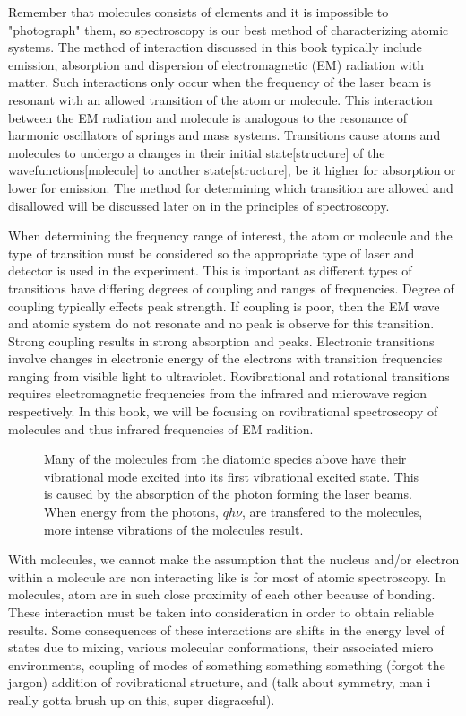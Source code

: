 \documentclass[11pt,a4paper]{book}
\newcommand{\imginput}[1]{} %
\begin{document}
		Remember that molecules consists of elements and it is impossible to "photograph" them, so spectroscopy is our best method of characterizing atomic systems. The method of interaction discussed in this book typically include emission, absorption and dispersion of electromagnetic (EM) radiation with matter. Such interactions only occur when the frequency of the laser beam is resonant with an allowed transition of the atom or molecule. This interaction between the EM radiation and molecule is analogous to the resonance of harmonic oscillators of springs and mass systems. Transitions cause atoms and molecules to undergo a changes in their initial state[structure] of the wavefunctions[molecule] to another state[structure], be it higher for absorption or lower for emission. The method for determining which transition are allowed and disallowed will be discussed later on in the principles of spectroscopy.
		
		When determining the frequency range of interest, the atom or molecule and the type of transition must be considered so the appropriate type of laser and detector is used in the experiment. This is important as different types of transitions have differing degrees of coupling and ranges of frequencies. Degree of coupling typically effects peak strength. If coupling is poor, then the EM wave and atomic system do not resonate and no peak is observe for this transition. Strong coupling results in strong absorption and peaks. Electronic transitions involve changes in electronic energy of the electrons with transition frequencies ranging from visible light to ultraviolet. Rovibrational and rotational transitions requires electromagnetic frequencies from the infrared and microwave region respectively. In this book, we will be focusing on rovibrational spectroscopy of molecules and thus infrared frequencies of EM radition.
	
		\begin{figure} [!ht]
			\centering
			\def\svgwidth{\columnwidth}
			\resizebox{15cm}{!}{\imginput{images/abs-rovib-trans.pdf_tex}}
			\caption{Many of the molecules from the  diatomic species above have their vibrational mode  excited into its first vibrational excited state. This is caused by the absorption of the photon forming the laser beams. When energy from the photons, $qh\nu$, are transfered to the molecules, more intense vibrations of the molecules result.}
			\label{fig:abs-rovib-trans}
		\end{figure}	
		
		With molecules, we cannot make the assumption that the nucleus and/or electron within a molecule are non interacting like is for most of atomic spectroscopy. In molecules, atom are in such close proximity of each other because of bonding. These interaction must be taken into consideration in order to obtain reliable results. Some consequences of these interactions are shifts in the energy level of states due to mixing, various molecular conformations, their associated micro environments, coupling of modes of something something something (forgot the jargon) addition of rovibrational structure, and (talk about symmetry, man i really gotta brush up on this, super disgraceful). 
\end{document}
